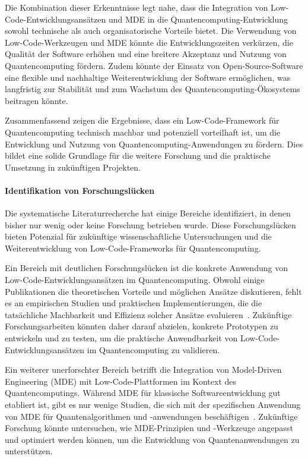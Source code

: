 Die Kombination dieser Erkenntnisse legt nahe, dass die Integration von Low-Code-Entwicklungsansätzen und MDE in 
die Quantencomputing-Entwicklung sowohl technische als auch organisatorische Vorteile bietet. Die Verwendung von 
Low-Code-Werkzeugen und MDE könnte die Entwicklungszeiten verkürzen, die Qualität der Software erhöhen und eine breitere 
Akzeptanz und Nutzung von Quantencomputing fördern. Zudem könnte der Einsatz von Open-Source-Software eine flexible 
und nachhaltige Weiterentwicklung der Software ermöglichen, was langfristig zur Stabilität und zum Wachstum des 
Quantencomputing-Ökosystems beitragen könnte.

Zusammenfassend zeigen die Ergebnisse, dass ein Low-Code-Framework für Quantencomputing technisch machbar und 
potenziell vorteilhaft ist, um die Entwicklung und Nutzung von Quantencomputing-Anwendungen zu fördern. Dies bildet 
eine solide Grundlage für die weitere Forschung und die praktische Umsetzung in zukünftigen Projekten.

\paragraph{Identifikation von Forschungslücken}

Die systematische Literaturrecherche hat einige Bereiche identifiziert, in denen bisher nur wenig oder keine Forschung 
betrieben wurde. Diese Forschungslücken bieten Potenzial für zukünftige wissenschaftliche Untersuchungen und 
die Weiterentwicklung von Low-Code-Frameworks für Quantencomputing.

Ein Bereich mit deutlichen Forschungslücken ist die konkrete Anwendung von Low-Code-Entwicklungsansätzen im 
Quantencomputing. Obwohl einige Publikationen die theoretischen Vorteile und möglichen Ansätze diskutieren, 
fehlt es an empirischen Studien und praktischen Implementierungen, die die tatsächliche Machbarkeit und Effizienz 
solcher Ansätze evaluieren~\cite{Perez-Delgado_2020, Gemeinhardt_2021}. Zukünftige Forschungsarbeiten könnten daher 
darauf abzielen, konkrete Prototypen zu entwickeln und zu testen, um die praktische Anwendbarkeit von 
Low-Code-Entwicklungsansätzen im Quantencomputing zu validieren.

Ein weiterer unerforschter Bereich betrifft die Integration von Model-Driven Engineering (MDE) mit Low-Code-Plattformen 
im Kontext des Quantencomputings. Während MDE für klassische Softwareentwicklung gut etabliert ist, gibt es nur wenige 
Studien, die sich mit der spezifischen Anwendung von MDE für Quantenalgorithmen und -anwendungen 
beschäftigen~\cite{Gemeinhardt_2023, Perez-Castillo_2022}. Zukünftige Forschung könnte untersuchen, wie MDE-Prinzipien 
und -Werkzeuge angepasst und optimiert werden können, um die Entwicklung von Quantenanwendungen zu unterstützen.

